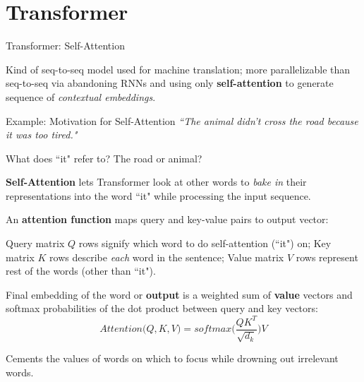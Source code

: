 
\section{Transformer}


\begin{frame}{Transformer: Self-Attention}
    
    \begin{itemizeSpaced}{2pt}
        \item Kind of seq-to-seq model used for machine translation; more parallelizable than seq-to-seq via abandoning RNNs and using only \textbf{self-attention} to generate sequence of \textit{contextual embeddings}.
        
    \end{itemizeSpaced}
    
    \begin{exampleBlock}{Example: Motivation for Self-Attention}
    {\large \emph{``The animal didn't cross the road because it was too tired."}}
    
    What does ``it" refer to? The road or animal?
    \end{exampleBlock}
    
    \begin{itemizeSpaced}{0pt}
        \pinkbox \textbf{Self-Attention} lets Transformer look at other words to \emph{bake in} their representations into the word ``it" while processing the input sequence.
        
        \item An \textbf{attention function} maps query and key-value pairs to output vector:
        
        \begin{itemizeSpaced}{0pt}
         
            \item Query matrix $Q$ rows signify which word to do self-attention (``it") on; Key matrix $K$ rows describe \emph{each} word in the sentence; Value matrix $V$ rows represent rest of the words (other than ``it"). 
            
            \item Final embedding of the word or \textbf{output} is a weighted sum of \textbf{value} vectors and softmax probabilities of the dot product between query and key vectors: 
            $$
            Attention \Big(Q, K, V \Big) = softmax \Bigg(\frac {QK^T} {\sqrt{d_k}} \Bigg) V
            $$
            
    \end{itemizeSpaced}
    
        \pinkbox Cements the values of words on which to focus while drowning out irrelevant words.
    \end{itemizeSpaced}
\end{frame}



